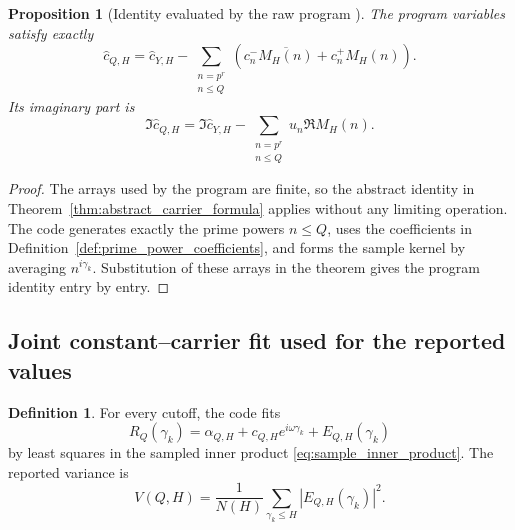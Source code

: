 \documentclass[11pt]{amsart}
\numberwithin{equation}{section}
\theoremstyle{plain}
\newtheorem{proposition}[theorem]{Proposition}
\theoremstyle{definition}
\newtheorem{definition}[theorem]{Definition}
\theoremstyle{remark}
\newcommand{\1}{\mathbf{1}}
\begin{document}
\begin{proposition}[Identity evaluated by the raw program {}]
\label{prop:numerical_raw_identity}
The program variables satisfy exactly
\begin{equation}
\widehat c_{Q,H}
=
\widehat c_{Y,H}
-
\sum_{\substack{n=p^r\\n\leq Q}}
\left(c_n^-\overline{M_H(n)}+c_n^+M_H(n)\right).
\label{eq:numerical_raw_identity}
\end{equation}
Its imaginary part is
\begin{equation}
\Im\widehat c_{Q,H}
=
\Im\widehat c_{Y,H}
-
\sum_{\substack{n=p^r\\n\leq Q}}
u_n\Re M_H(n).
\label{eq:numerical_imag_identity}
\end{equation}
\end{proposition}

\begin{proof}
The arrays used by the program are finite, so the abstract identity in
Theorem~\ref{thm:abstract_carrier_formula} applies without any limiting
operation.  The code generates exactly the prime powers \(n\leq Q\), uses
the coefficients in Definition~\ref{def:prime_power_coefficients}, and
forms the sample kernel by averaging \(n^{i\gamma_k}\).  Substitution of
these arrays in the theorem gives the program identity entry by entry.
\end{proof}

\subsection{Joint constant--carrier fit used for the reported values}
\label{subsec:numerical_joint_fit}

\begin{definition}
\label{def:numerical_joint_fit}
For every cutoff, the code fits
\begin{equation}
R_Q(\gamma_k)
=
\alpha_{Q,H}+c_{Q,H}e^{i\omega\gamma_k}+E_{Q,H}(\gamma_k)
\label{eq:numerical_joint_model}
\end{equation}
by least squares in the sampled inner product
\eqref{eq:sample_inner_product}.  The reported variance is
\begin{equation}
V(Q,H)
=
\frac1{N(H)}
\sum_{\gamma_k\leq H}|E_{Q,H}(\gamma_k)|^2.
\label{eq:numerical_reported_variance}
\end{equation}
\end{definition}
\end{document}
